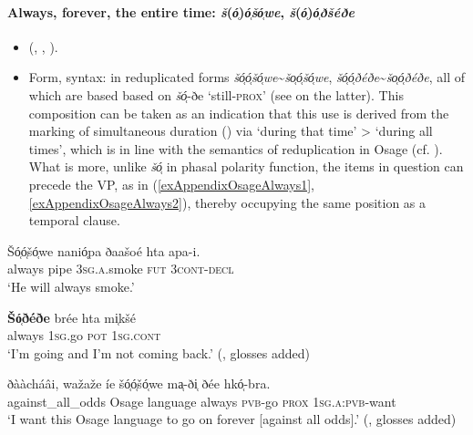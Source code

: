 \paragraph{Always, forever, the entire time: \textit{š}(\textit{ó̜})\textit{ó̜šó̜we}, \textit{š}(\textit{ó̜})\textit{ó̜ðšéðe}}\label{appendixOsageAlways}
\begin{itemize}
	\item \citeauthor{Quintero1997} (\citeyear[305, 362–363]{Quintero1997}, \citeyear[87, 444]{Quintero2004}, \citeyear[209]{QuinteroDictionary}).
	\item Form, syntax: in reduplicated forms \textit{šó̜ó̜šó̜we}\sim\textit{šo̜ó̜šó̜we}, \textit{šó̜ó̜ðéðe}\sim\textit{šo̜ó̜ðéðe}, all of which are based based on \mbox{\textit{šó̜}-{ðe}} \lq still-\textsc{prox}' (see  on the latter). This composition can be taken as an indication that this use is derived from the marking of simultaneous duration () via \lq during that time' > \lq during all times', which is in line with the semantics of reduplication in Osage (cf. \cite[87]{Quintero2004}). What is more, unlike \textit{šó̜} in phasal polarity function, the items in question can precede the VP, as in (\ref{exAppendixOsageAlways1}, \ref{exAppendixOsageAlways2}), thereby occupying the same position as a temporal clause.
\end{itemize}
\begin{exe}
	\ex\label{exAppendixOsageAlways1}
	\gll Šó̜ó̜šó̜we nanió̜pa ðaašoé hta apa-i.\\
	always pipe 3\textsc{sg}.\textsc{a}.smoke \textsc{fut} 3\textsc{cont}-\textsc{decl}\\
	\glt \lq He will always smoke.'  \parencite[328]{Quintero2004}

	\ex\label{exAppendixOsageAlways2}
\gll \textbf{Šó̜ðéðe} brée hta mi̜kšé\\
always 1\textsc{sg}.go \textsc{pot} 1\textsc{sg}.\textsc{cont}\\
\glt \lq I'm going and I'm not coming back.'  (\cite[209]{QuinteroDictionary}, glosses added)

	\ex\label{exAppendixOsageAlways3}
	\gll ðààcháâi, wažaže íe šó̜ó̜šó̜we ma̜-ði̜ ðée hkó̜-bra.\\
	against\_all\_odds	Osage language always \textsc{pvb}-go \textsc{prox} 1\textsc{sg}.\textsc{a}:\textsc{pvb}-want\\
	\glt \lq I want this Osage language to go on forever [against all odds].' (\cite[32]{QuinteroDictionary}, glosses added)
\end{exe}

